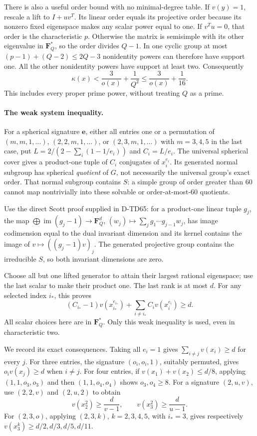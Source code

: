 There is also a useful order bound with no minimal-degree table.
If \(v(y)=1\), rescale a lift to \(I+uv^T\).
Its linear order equals its projective order because its
nonzero fixed eigenspace makes any scalar power equal to one.
If \(v^Tu=0\), that order is the characteristic \(p\).
Otherwise the matrix is semisimple with its other eigenvalue
in \(\mathbf F_Q^*\), so the order divides \(Q-1\).
In one cyclic group at most \((p-1)+(Q-2)\le2Q-3\)
nonidentity powers can therefore have support one.
All the other nonidentity powers have support at least two.
Consequently
\[
                         \kappa(x)<\frac3{o(x)}+\frac1{Q^2}
                                  \le\frac3{o(x)}+\frac1{16}.
 \tag{QPL.6}
\]
This includes every proper prime power, without treating
\(Q\) as a prime.

\paragraph{The weak system inequality.}
For a spherical signature \(\mathbf e\), either all entries
one or a permutation of
\((m,m,1,\ldots)\), \((2,2,m,1,\ldots)\), or
\((2,3,m,1,\ldots)\) with \(m=3,4,5\) in the last case, put
\(L=2/(2-\sum_i(1-1/e_i))\) and \(C_i=L/e_i\).
The universal spherical cover gives a product-one tuple of
\(C_i\) conjugates of \(x_i^{e_i}\).
Its generated normal subgroup has spherical \emph{quotient}
of \(G\), not necessarily the universal group's exact order.
That normal subgroup contains \(S\): a simple group of order
greater than 60 cannot map nontrivially into these solvable
or order-at-most-60 quotients.

Use the direct Scott proof supplied in D-TD65: for a
product-one linear tuple \(g_j\), the map
\(\bigoplus\operatorname{im}(g_j-1)\to\mathbf F_Q^d\),
\((w_j)\mapsto\sum_jg_1\cdots g_{j-1}w_j\), has image
codimension equal to the dual invariant dimension and its
kernel contains the image of \(v\mapsto((g_j-1)v)_j\).
The generated projective group contains the irreducible
\(S\), so both invariant dimensions are zero.

Choose all but one lifted generator to attain their largest
rational eigenspace; use the last scalar to make their
product one. The last rank is at most \(d\). For any selected
index \(i_*\), this proves
\[
 (C_{i_*}-1)v(x_{i_*}^{e_{i_*}})
             +\sum_{i\ne i_*}C_i v(x_i^{e_i})\ge d.
 \tag{QPL.7}
\]
All scalar choices here are in \(\mathbf F_Q^*\).
Only this weak inequality is used, even in characteristic two.

We record its exact consequences. Taking all \(e_i=1\) gives
\(\sum_{i\ne j}v(x_i)\ge d\) for every \(j\).
For three entries, the signature \((o_i,o_i,1)\),
suitably permuted, gives \(o_i v(x_j)\ge d\) when \(i\ne j\).
For four entries, if
\(v(x_1)+v(x_2)\le d/8\), applying
\((1,1,o_3,o_3)\) and then
\((1,1,o_4,o_4)\) shows \(o_3,o_4\ge8\).
For a signature \((2,u,v)\), use \((2,2,v)\)
and \((2,u,2)\) to obtain
\[
 v(x_2^2)\ge\frac d{v-1},\qquad
 v(x_3^2)\ge\frac d{u-1}.
 \tag{QPL.8}
\]
For \((2,3,o)\), applying \((2,3,k)\),
\(k=2,3,4,5\), with \(i_*=3\), gives respectively
\(v(x_3^k)\ge d/2,d/3,d/5,d/11\).

